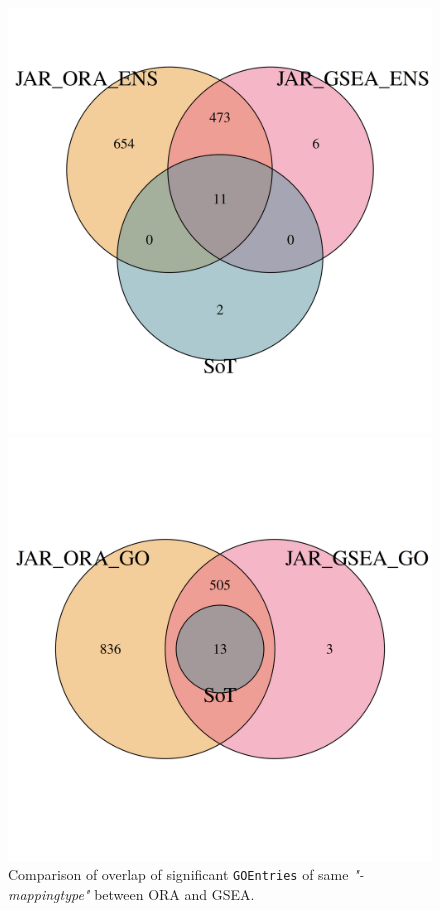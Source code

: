\documentclass[12pt]{article}
\begin{document}
\begin{figure}[htpb]
    \centering
    \begin{minipage}{0.49\textwidth}
        \centering
        \includegraphics[width=\textwidth]{./plots/ensOverlap.png}
    \end{minipage}
    \hfill
    \begin{minipage}{0.49\textwidth}
        \centering
        \includegraphics[width=\textwidth]{./plots/goOverlap.png}
    \end{minipage}

    \caption{Comparison of overlap of significant \texttt{GOEntries} of same \textit{"-mappingtype"} between ORA and GSEA.}
    \label{fig:overlap}
\end{figure}
\end{document}

